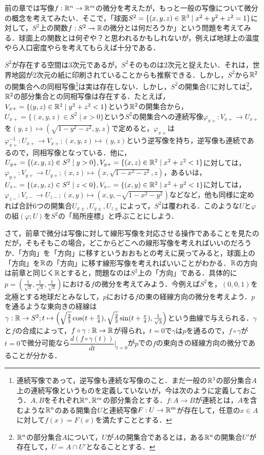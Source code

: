 前の章では写像$f:{\mathbb R}^n\rightarrow{\mathbb R}^m$の微分を考えたが，もっと一般の写像について微分の概念を考えてみたい．そこで，「球面$S^2=\{(x,y,z)\in{\mathbb R}^3\mid x^2+y^2+z^2=1\}$に対して，$S^2$上の関数$f:S^2\rightarrow{\mathbb R}$の微分とは何だろうか」という問題を考えてみる．球面上の関数とは何ぞや？と思われるかもしれないが，例えば地球上の温度やら人口密度やらを考えてもらえば十分である．


$S^2$が存在する空間は3次元であるが，$S^2$そのものは2次元と捉えたい．それは，世界地図が2次元の紙に印刷されていることからも推察できる．しかし，$S^2$から${\mathbb R}^2$の開集合への同相写像\footnote{連続写像であって，逆写像も連続な写像のこと．まだ一般の${\mathbb R}^3$の部分集合$A$上の連続写像というものを定義していないが，今は次のように定義しておこう．$A,B$をそれぞれ${\mathbb R}^n,{\mathbb R}^m$の部分集合とする．$f:A\rightarrow B$が連続とは，$A$を含むような${\mathbb R}^n$のある開集合$U$と連続写像$F:U\rightarrow {\mathbb R}^m$が存在して，任意の$x\in A$に対して$f(x)=F(x)$を満たすこととする．}は実は存在しない．しかし，$S^2$の開集合$U$に対しては\footnote{${\mathbb R}^n$の部分集合$A$について，$U$が$A$の開集合であるとは，ある${\mathbb R}^n$の開集合$U'$が存在して，$U=A\cap U'$となることとする．}，${\mathbb R}^2$の部分集合との同相写像は存在する．たとえば，$V_{x+}=\{(y,z)\in {\mathbb R}^2\mid y^2+z^2<1\}$という${\mathbb R}^2$の開集合から，$U_{x+}=\{(x,y,z)\in S^2\mid x>0\}$という$S^2$の開集合への連続写像$\varphi_{x+}:V_{x+}\rightarrow U_{x+}$を$(y,z)\mapsto (\sqrt{1-y^2-z^2},y,z)$で定めると，$\varphi_{x+}$は$\varphi_{x+}^{-1}:U_{x+}\rightarrow V_{x+};(x,y,z)\mapsto (y,z)$という逆写像を持ち，逆写像も連続であるので，同相写像となっている．他に，$U_{y+}=\{(x,y,z)\in S^2\mid y>0\},V_{y+}=\{(x,z)\in{\mathbb R}^2\mid x^2+z^2<1\}$に対しては，$\varphi_{y+}:V_{y+}\rightarrow U_{y+};(x,z)\mapsto (x,\sqrt{1-x^2-z^2},z)$，あるいは，$U_{z-}=\{(x,y,z)\in S^2\mid z<0\},V_{z-}=\{(x,y)\in{\mathbb R}^2\mid x^2+y^2<1\}$に対しては，$\varphi_{z-}:V_{z-}\rightarrow U_{z-};(x,y)\mapsto (x,y,-\sqrt{1-x^2-y^2})$などなど，他も同様に定めれば合計$6$つの開集合$U_{x\pm},U_{y\pm},U_{z\pm}$によって，$S^2$は覆われる．このような$U$と$\varphi$の組$(\varphi;U)$を$S^2$の「局所座標」と呼ぶことにしよう．


さて，前章で微分は写像に対して線形写像を対応させる操作であることを見たのだが，そもそもこの場合，どこからどこへの線形写像を考えればいいのだろうか．「方向」を「方向」に移すというおおもとの考えに戻ってみると，球面上の「方向」を${\mathbb R}$の「方向」に移す線形写像を考えればいいことがわかる．${\mathbb R}$の方向は前章と同じく${\mathbb R}$とすると，問題なのは$S^2$上の「方向」である．具体的に$p=\left(\frac{1}{\sqrt{3}},\frac{1}{\sqrt{3}},\frac{1}{\sqrt{3}}\right)$における$f$の微分を考えてみよう．今例えば$S^2$を，$(0,0,1)$を北極とする地球だとみなして，$p$における$f$の東の経線方向の微分を考えよう．$p$を通るような東向きの経線は$\gamma:{\mathbb R}\rightarrow S^2;t\mapsto\left(\sqrt{\frac{2}{3}}\cos(t+\frac{\pi}{4}),\sqrt{\frac{2}{3}}\sin(t+\frac{\pi}{4}),\frac{1}{\sqrt{3}}\right)$という曲線で与えられる．$\gamma$と$f$の合成によって，$f\circ \gamma:{\mathbb R}\rightarrow{\mathbb R}$が得られ，$t=0$で$\gamma$は$p$を通るので，$f\circ\gamma$が$t=0$で微分可能なら$\dfrac{d(f\circ\gamma(t))}{dt}\Big|_{t=0}$が$p$での$f$の東向きの経線方向の微分であることが分かる．



